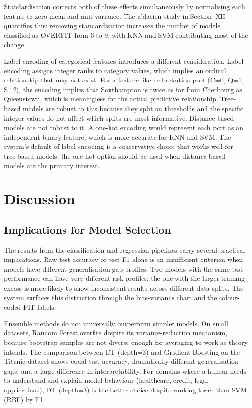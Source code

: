 \documentclass[conference]{IEEEtran}
\begin{document}
Standardisation corrects both of these effects simultaneously by normalising each feature to zero mean and unit variance. The ablation study in Section~XII quantifies this: removing standardisation increases the number of models classified as OVERFIT from 6 to 9, with KNN and SVM contributing most of the change.

Label encoding of categorical features introduces a different consideration. Label encoding assigns integer ranks to category values, which implies an ordinal relationship that may not exist. For a feature like embarkation port (C=0, Q=1, S=2), the encoding implies that Southampton is twice as far from Cherbourg as Queenstown, which is meaningless for the actual predictive relationship. Tree-based models are robust to this because they split on thresholds and the specific integer values do not affect which splits are most informative. Distance-based models are not robust to it. A one-hot encoding would represent each port as an independent binary feature, which is more accurate for KNN and SVM. The system's default of label encoding is a conservative choice that works well for tree-based models; the one-hot option should be used when distance-based models are the primary interest.

\section{Discussion}

\subsection{Implications for Model Selection}

The results from the classification and regression pipelines carry several practical implications. Raw test accuracy or test F1 alone is an insufficient criterion when models have different generalisation gap profiles. Two models with the same test performance can have very different risk profiles: the one with the larger training excess is more likely to show inconsistent results across different data splits. The system surfaces this distinction through the bias-variance chart and the colour-coded FIT labels.

Ensemble methods do not universally outperform simpler models. On small datasets, Random Forest overfits despite its variance-reduction mechanism, because bootstrap samples are not diverse enough for averaging to work as theory intends. The comparison between DT (depth=3) and Gradient Boosting on the Titanic dataset shows equal test accuracy, dramatically different generalisation gaps, and a large difference in interpretability. For domains where a human needs to understand and explain model behaviour (healthcare, credit, legal applications), DT (depth=3) is the better choice despite ranking lower than SVM (RBF) by F1.
\end{document}
